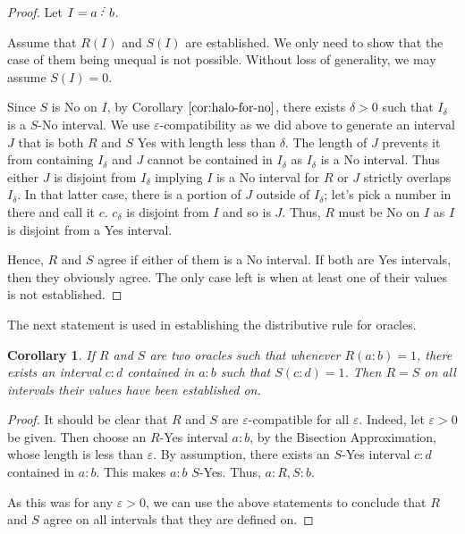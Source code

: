 \documentclass[12pt]{article}
\newtheorem{corollary}{Corollary}[subsection]
\begin{document}
\begin{proof}
Let $I = a \lte b$. 

Assume that $R(I)$ and $S(I)$ are established. We only need to show that the case of them being unequal is not possible. Without loss of generality, we may assume $S(I)=0$.

Since $S$ is No on $I$, by Corollary $\ref{cor:halo-for-no}$, there exists $\delta > 0$ such that $I_\delta$ is a $S$-No interval. We use $\varepsilon$-compatibility as we did above to generate an interval $J$ that is both $R$ and $S$ Yes with length less than $\delta$. The length of $J$ prevents it from containing $I_\delta$ and $J$ cannot be contained in $I_\delta$ as $I_\delta$ is a No interval. Thus either $J$ is disjoint from $I_\delta$ implying $I$ is a No interval for $R$ or $J$ strictly overlaps $I_\delta$. In that latter case, there is a portion of $J$ outside of $I_\delta$; let's pick a number in there and call it $c$. $c_\delta$ is disjoint from $I$ and so is $J$. Thus, $R$ must be No on $I$ as $I$ is disjoint from a Yes interval. 

Hence, $R$ and $S$ agree if either of them is a No interval. If both are Yes intervals, then they obviously agree. The only case left is when at least one of their values is not established. 


\end{proof}


The next statement is used in establishing the distributive rule for oracles. 

\begin{corollary}
    If $R$ and $S$ are two oracles such that whenever $R(a:b) = 1$, there exists an interval $c:d$ contained in $a:b$ such that $S(c:d) = 1$. Then $R=S$ on all intervals their values have been established on.
\end{corollary}

\begin{proof}
It should be clear that $R$ and $S$ are $\varepsilon$-compatible for all $\varepsilon$. Indeed, let $\varepsilon >0$ be given. Then choose an $R$-Yes interval $a:b$, by the Bisection Approximation, whose length is less than $\varepsilon$. By assumption, there exists an $S$-Yes interval $c:d$ contained in $a:b$. This makes $a:b$ $S$-Yes. Thus, $a:R,S:b$. 

As this was for any $\varepsilon >0$, we can use the above statements to conclude that $R$ and $S$ agree on all intervals that they are defined on. 
\end{proof}
\end{document}
